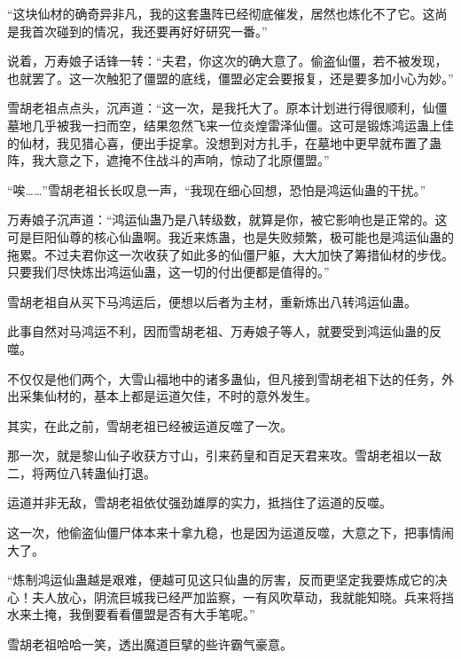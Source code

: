 \begin{this_body}
“这块仙材的确奇异非凡，我的这套蛊阵已经彻底催发，居然也炼化不了它。这尚是我首次碰到的情况，我还要再好好研究一番。”

说着，万寿娘子话锋一转：“夫君，你这次的确大意了。偷盗仙僵，若不被发现，也就罢了。这一次触犯了僵盟的底线，僵盟必定会要报复，还是要多加小心为妙。”

雪胡老祖点点头，沉声道：“这一次，是我托大了。原本计划进行得很顺利，仙僵墓地几乎被我一扫而空，结果忽然飞来一位炎煌雷泽仙僵。这可是锻炼鸿运蛊上佳的仙材，我见猎心喜，便出手捉拿。没想到对方扎手，在墓地中更早就布置了蛊阵，我大意之下，遮掩不住战斗的声响，惊动了北原僵盟。”

“唉……”雪胡老祖长长叹息一声，“我现在细心回想，恐怕是鸿运仙蛊的干扰。”

万寿娘子沉声道：“鸿运仙蛊乃是八转级数，就算是你，被它影响也是正常的。这可是巨阳仙尊的核心仙蛊啊。我近来炼蛊，也是失败频繁，极可能也是鸿运仙蛊的拖累。不过夫君你这一次收获了如此多的仙僵尸躯，大大加快了筹措仙材的步伐。只要我们尽快炼出鸿运仙蛊，这一切的付出便都是值得的。”

雪胡老祖自从买下马鸿运后，便想以后者为主材，重新炼出八转鸿运仙蛊。

此事自然对马鸿运不利，因而雪胡老祖、万寿娘子等人，就要受到鸿运仙蛊的反噬。

不仅仅是他们两个，大雪山福地中的诸多蛊仙，但凡接到雪胡老祖下达的任务，外出采集仙材的，基本上都是运道欠佳，不时的意外发生。

其实，在此之前，雪胡老祖已经被运道反噬了一次。

那一次，就是黎山仙子收获方寸山，引来药皇和百足天君来攻。雪胡老祖以一敌二，将两位八转蛊仙打退。

运道并非无敌，雪胡老祖依仗强劲雄厚的实力，抵挡住了运道的反噬。

这一次，他偷盗仙僵尸体本来十拿九稳，也是因为运道反噬，大意之下，把事情闹大了。

“炼制鸿运仙蛊越是艰难，便越可见这只仙蛊的厉害，反而更坚定我要炼成它的决心！夫人放心，阴流巨城我已经严加监察，一有风吹草动，我就能知晓。兵来将挡水来土掩，我倒要看看僵盟是否有大手笔呢。”

雪胡老祖哈哈一笑，透出魔道巨擘的些许霸气豪意。

\end{this_body}

